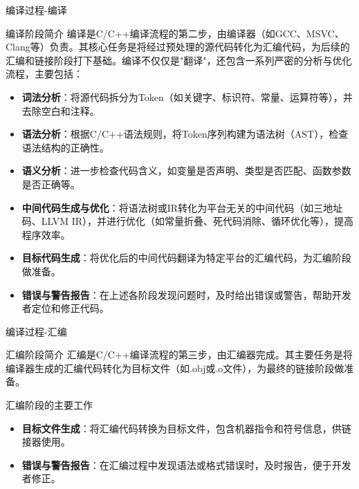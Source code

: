\documentclass[UTF8,aspectratio=169]{beamer}
\begin{document}
\begin{frame}{编译过程-编译}
    \begin{ytublock}{编译阶段简介}
        \small
        编译是C/C++编译流程的第二步，由编译器（如GCC、MSVC、Clang等）负责。其核心任务是将经过预处理的源代码转化为汇编代码，为后续的汇编和链接阶段打下基础。编译不仅仅是"翻译"，还包含一系列严密的分析与优化流程，主要包括：
        \begin{itemize}
            \item \textbf{词法分析}：将源代码拆分为Token（如关键字、标识符、常量、运算符等），并去除空白和注释。
            \item \textbf{语法分析}：根据C/C++语法规则，将Token序列构建为语法树（AST），检查语法结构的正确性。
            \item \textbf{语义分析}：进一步检查代码含义，如变量是否声明、类型是否匹配、函数参数是否正确等。
            \item \textbf{中间代码生成与优化}：将语法树或IR转化为平台无关的中间代码（如三地址码、LLVM IR），并进行优化（如常量折叠、死代码消除、循环优化等），提高程序效率。
            \item \textbf{目标代码生成}：将优化后的中间代码翻译为特定平台的汇编代码，为汇编阶段做准备。
            \item \textbf{错误与警告报告}：在上述各阶段发现问题时，及时给出错误或警告，帮助开发者定位和修正代码。
        \end{itemize}
    \end{ytublock}
\end{frame}

\begin{frame}{编译过程-汇编}
    \begin{ytublock}{汇编阶段简介}
        汇编是C/C++编译流程的第三步，由汇编器完成。其主要任务是将编译器生成的汇编代码转化为目标文件（如.obj或.o文件），为最终的链接阶段做准备。
    \end{ytublock}
    \begin{ytublock}{汇编阶段的主要工作}
        \begin{itemize}
            \item \textbf{目标文件生成}：将汇编代码转换为目标文件，包含机器指令和符号信息，供链接器使用。
            \item \textbf{错误与警告报告}：在汇编过程中发现语法或格式错误时，及时报告，便于开发者修正。
        \end{itemize}
    \end{ytublock}
\end{frame}
\end{document}
